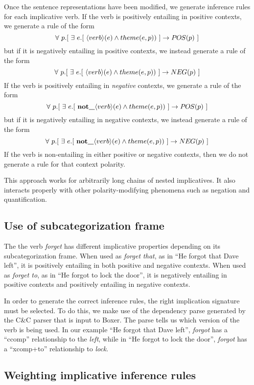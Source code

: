 Once the sentence representations have been modified, we generate inference
rules for each implicative verb.  If the verb is positively entailing in
positive contexts, we generate a rule of the form 
\[ \forall~ p.[~ \exists~ e.[~ \langle verb \rangle(e) \land theme(e,p)) ~] \to \POS{p} ~] \]
but if it is negatively entailing in positive contexts, we instead generate a rule of the form
\[ \forall~ p.[~ \exists~ e.[~ \langle verb \rangle(e) \land theme(e,p)) ~] \to \NEG{p} ~] \]
If the verb is positively entailing in {\it negative} contexts, we generate a rule of the form
\[ \forall~ p.[~ \exists~ e.[~ \textbf{not\_}\langle verb \rangle(e) \land theme(e,p)) ~] \to \POS{p} ~] \]
but if it is negatively entailing in negative contexts, we instead generate a rule of the form
\[ \forall~ p.[~ \exists~ e.[~ \textbf{not\_}\langle verb \rangle(e) \land theme(e,p)) ~] \to \NEG{p} ~] \]
If the verb is non-entailing in either positive or negative contexts, then we do
not generate a rule for that context polarity. 

This approach works for arbitrarily long chains of nested implicatives.  It also
interacts properly with other polarity-modifying phenomena such as negation
and quantification.



\subsection*{Use of subcategorization frame}

The the verb {\it forget} has different implicative properties depending on its
subcategorization frame.  When used as {\it forget that}, as in ``He forgot that
Dave left'', it is positively entailing in both positive and negative contexts. 
When used as {\it forget to}, as in ``He forgot to lock the door'', it is
negatively entailing in positive contexts and positively entailing in negative
contexts.

In order to generate the correct inference rules, the right implication
signature must be selected.  To do this, we make use of the dependency parse
generated by the C\&C parser that is input to Boxer.  The parse tells us which
version of the verb is being used.  In our example ``He forgot that
Dave left'', {\it forgot} has a ``ccomp'' relationship to the {\it left}, while
in ``He forgot to lock the door'', {\it forgot} has a ``xcomp+to'' relationship
to {\it lock}.


\subsection*{Weighting implicative inference rules}

